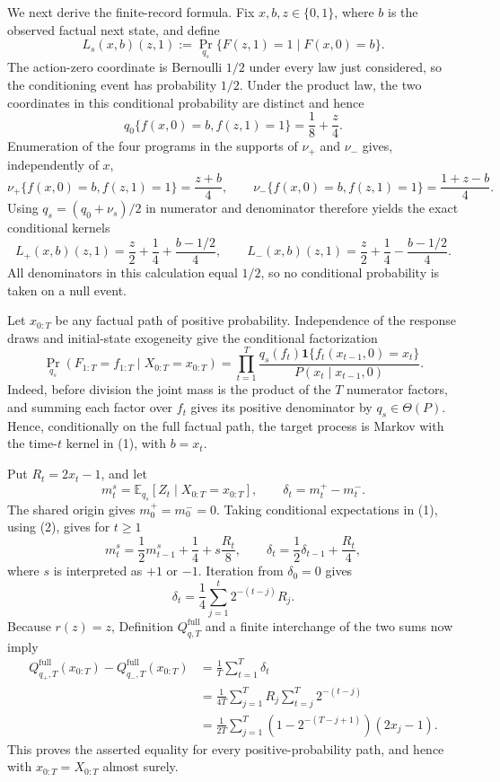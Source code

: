 We next derive the finite-record formula.  Fix \(x,b,z\in\{0,1\}\), where \(b\) is the observed factual next state, and define
\[
 L_s(x,b)(z,1)
 :=\Pr_{q_s}\{F(z,1)=1\mid F(x,0)=b\}.
\]
The action-zero coordinate is Bernoulli \(1/2\) under every law just considered, so the conditioning event has probability \(1/2\).  Under the product law, the two coordinates in this conditional probability are distinct and hence
\[
 q_0\{f(x,0)=b,f(z,1)=1\}=\frac18+\frac z4.
\]
Enumeration of the four programs in the supports of \(\nu_+\) and \(\nu_-\) gives, independently of \(x\),
\[
 \nu_+\{f(x,0)=b,f(z,1)=1\}=\frac{z+b}{4},
 \qquad
 \nu_-\{f(x,0)=b,f(z,1)=1\}=\frac{1+z-b}{4}.
\]
Using \(q_s=(q_0+\nu_s)/2\) in numerator and denominator therefore yields the exact conditional kernels
\[
 L_+(x,b)(z,1)=\frac z2+\frac14+\frac{b-1/2}{4},
 \qquad
 L_-(x,b)(z,1)=\frac z2+\frac14-\frac{b-1/2}{4}.
 \tag{1}
\]
All denominators in this calculation equal \(1/2\), so no conditional probability is taken on a null event.

Let \(x_{0:T}\) be any factual path of positive probability.  Independence of the response draws and initial-state exogeneity give the conditional factorization
\[
 \Pr_{q_s}(F_{1:T}=f_{1:T}\mid X_{0:T}=x_{0:T})
 =\prod_{t=1}^T
 \frac{q_s(f_t)\mathbf 1\{f_t(x_{t-1},0)=x_t\}}
 {P(x_t\mid x_{t-1},0)}.
 \tag{2}
\]
Indeed, before division the joint mass is the product of the \(T\) numerator factors, and summing each factor over \(f_t\) gives its positive denominator by \(q_s\in\Theta(P)\).  Hence, conditionally on the full factual path, the target process is Markov with the time-\(t\) kernel in (1), with \(b=x_t\).

Put \(R_t=2x_t-1\), and let
\[
 m_t^s=\mathbb E_{q_s}[Z_t\mid X_{0:T}=x_{0:T}],
 \qquad \delta_t=m_t^+-m_t^-.
\]
The shared origin gives \(m_0^+=m_0^-=0\).  Taking conditional expectations in (1), using (2), gives for \(t\ge1\)
\[
 m_t^s=\frac12m_{t-1}^s+\frac14+s\frac{R_t}{8},
 \qquad
 \delta_t=\frac12\delta_{t-1}+\frac{R_t}{4},
\]
where \(s\) is interpreted as \(+1\) or \(-1\).  Iteration from \(\delta_0=0\) gives
\[
 \delta_t=\frac14\sum_{j=1}^t2^{-(t-j)}R_j.
\]
Because \(r(z)=z\), Definition \(Q^{\mathrm{full}}_{q,T}\) and a finite interchange of the two sums now imply
\[
 \begin{aligned}
 Q^{\mathrm{full}}_{q_+,T}(x_{0:T})
 -Q^{\mathrm{full}}_{q_-,T}(x_{0:T})
 &=\frac1T\sum_{t=1}^T\delta_t\\
 &=\frac1{4T}\sum_{j=1}^TR_j\sum_{t=j}^T2^{-(t-j)}\\
 &=\frac1{2T}\sum_{j=1}^T
 \left(1-2^{-(T-j+1)}\right)(2x_j-1).
 \end{aligned}
 \tag{3}
\]
This proves the asserted equality for every positive-probability path, and hence with \(x_{0:T}=X_{0:T}\) almost surely.

